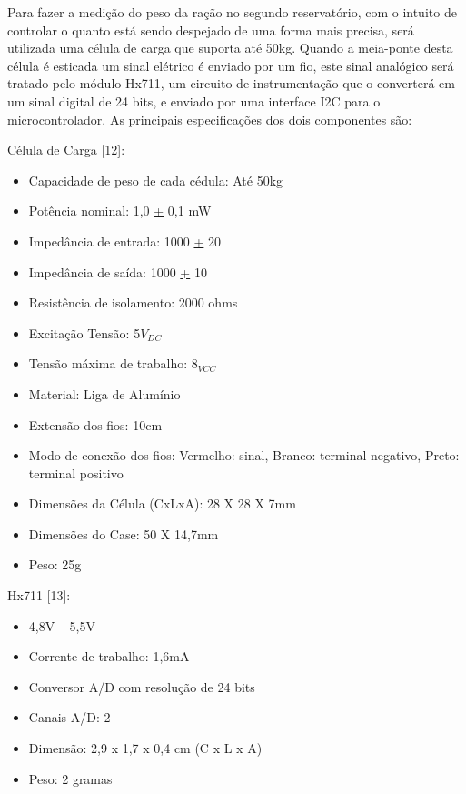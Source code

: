 Para fazer a medição do peso da ração no segundo reservatório, com o intuito de controlar o quanto está sendo despejado de uma forma mais precisa, será utilizada uma célula de carga que suporta até 50kg. Quando a meia-ponte desta célula é esticada um sinal elétrico é enviado por um fio, este sinal analógico será tratado pelo módulo Hx711, um circuito de instrumentação que o converterá em um sinal digital de 24 bits, e enviado por uma interface I2C para o microcontrolador. As principais especificações dos dois componentes são:

Célula de Carga [12]:
\begin{itemize}
\item Capacidade de peso de cada cédula: Até 50kg
\item Potência nominal: 1,0 \underline{+} 0,1 mW
\item Impedância de entrada: 1000 \underline{+} 20%
\item Impedância de saída: 1000 \underline{+} 10%
\item Resistência de isolamento: 2000 ohms
\item Excitação Tensão: 5$V_{DC}$
\item Tensão máxima de trabalho: $8_{VCC}$
\item Material: Liga de Alumínio
\item Extensão dos fios: 10cm
\item Modo de conexão dos fios: Vermelho: sinal, Branco: terminal negativo, Preto: terminal positivo
\item Dimensões da Célula (CxLxA): 28 X 28 X 7mm
\item Dimensões do Case: 50 X 14,7mm
\item Peso: 25g
\end{itemize}

Hx711 [13]:
\begin{itemize}
\item 4,8V ~ 5,5V
\item Corrente de trabalho: 1,6mA
\item Conversor A/D com resolução de 24 bits
\item Canais A/D: 2
\item Dimensão: 2,9 x 1,7 x 0,4 cm (C x L x A)
\item Peso: 2 gramas
\end{itemize}


